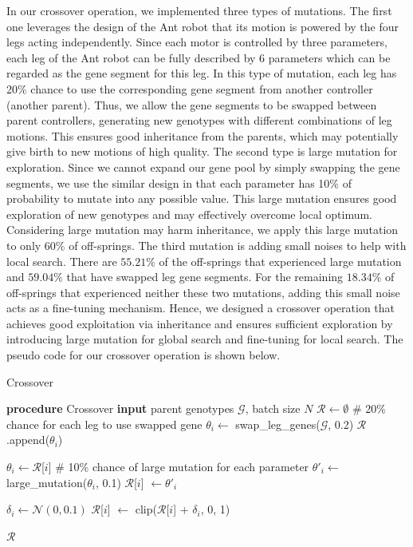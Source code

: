 In our crossover operation, we implemented three types of mutations.
The first one leverages the design of the Ant robot that its motion is powered by the four legs acting independently.
Since each motor is controlled by three parameters, each leg of the Ant robot can be fully described by 6 parameters which can be regarded as the gene segment for this leg.
In this type of mutation, each leg has 20\% chance to use the corresponding gene segment from another controller (another parent).
Thus, we allow the gene segments to be swapped between parent controllers, generating new genotypes with different combinations of leg motions.
This ensures good inheritance from the parents, which may potentially give birth to new motions of high quality.
The second type is large mutation for exploration.
Since we cannot expand our gene pool by simply swapping the gene segments, we use the similar design in \cite{cully2015robots} that each parameter has 10\% of probability to mutate into any possible value. 
This large mutation ensures good exploration of new genotypes and may effectively overcome local optimum.
Considering large mutation may harm inheritance, we apply this large mutation to only 60\% of off-springs.
The third mutation is adding small noises to help with local search.
There are $55.21\%$ of the off-springs that experienced large mutation and $59.04\%$ that have swapped leg gene segments.
For the remaining $18.34\%$ of off-springs that experienced neither these two mutations, adding this small noise acts as a fine-tuning mechanism.
Hence, we designed a crossover operation that achieves good exploitation via inheritance and ensures sufficient exploration by introducing large mutation for global search and fine-tuning for local search. 
The pseudo code for our crossover operation is shown below.


\begin{algorithm}
\caption{Crossover}
\begin{algorithmic}
\STATE \textbf{procedure} Crossover
\STATE \textbf{input} parent genotypes $\mathcal{G}$, batch size $N$
\STATE $\mathcal{R} \leftarrow \emptyset$ 
\STATE \# 20\% chance for each leg to use swapped gene
\STATE $\theta_i \leftarrow $ swap{\_}leg{\_}genes($\mathcal{G}$, 0.2)
\STATE $\mathcal{R}$.append($\theta_i$)
\ENDFOR

\STATE  {}
\STATE $\theta_i \leftarrow \mathcal{R}$[$i$] 
\STATE \# 10\% chance of large mutation for each parameter 
\STATE $\theta'_i \leftarrow$ large{\_}mutation($\theta_i$, 0.1)
\STATE $\mathcal{R}$[$i$] $\leftarrow \theta'_i$
\ENDIF
\ENDFOR

\STATE  {}
\STATE $\delta_i \leftarrow \mathcal{N}(0, 0.1)$
\STATE $\mathcal{R}$[$i$] $\leftarrow$ clip($\mathcal{R}$[$i$] + $\delta_i$, 0, 1)
\ENDFOR

\RETURN $\mathcal{R}$
\end{algorithmic}
\label{Crossover}
\end{algorithm}


